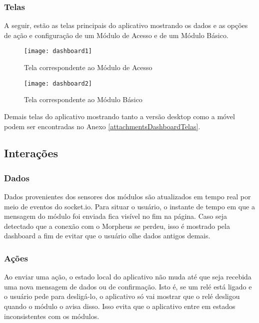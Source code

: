 \subsubsection{Telas}

A seguir, estão as telas principais do aplicativo mostrando os dados e as opções de ação e configuração de um Módulo de Acesso e de um Módulo Básico.

\begin{figure}[H]
	\centering
	\caption{Tela correspondente ao Módulo de Acesso}
  \texttt{[image: dashboard1]}
\label{fig:dashboard1}
\end{figure}

\begin{figure}[H]
	\centering
	\caption{Tela correspondente ao Módulo Básico}
  \texttt{[image: dashboard2]}
\label{fig:dashboard2}
\end{figure}

Demais telas do aplicativo mostrando tanto a versão desktop como a móvel podem ser encontradas no Anexo \ref{attachmentsDashboardTelas}.

\subsection{Interações}

\subsubsection{Dados}

Dados provenientes dos sensores dos módulos são atualizados em tempo real por meio de eventos do socket.io. Para situar o usuário, o instante de tempo em que a mensagem do módulo foi enviada fica visível no fim na página. Caso seja detectado que a conexão com o Morpheus se perdeu, isso é mostrado pela dashboard a fim de evitar que o usuário olhe dados antigos demais.

\subsubsection{Ações}

Ao enviar uma ação, o estado local do aplicativo não muda até que seja recebida uma nova mensagem de dados ou de confirmação. Isto é, se um relé está ligado e o usuário pede para desligá-lo, o aplicativo só vai mostrar que o relé desligou quando o módulo o avisa disso. Isso evita que o aplicativo entre em estados inconsistentes com os módulos.

